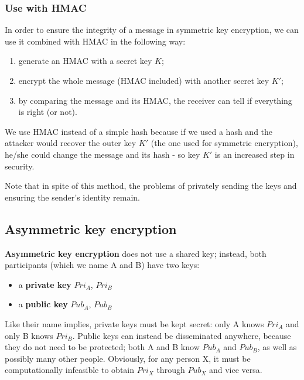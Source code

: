 
\subsubsection{Use with HMAC}
In order to ensure the integrity of a message in symmetric key encryption, we can use it combined with HMAC in the following way:

\begin{enumerate}
    \item generate an HMAC with a secret key $K$;
    \item encrypt the whole message (HMAC included) with another secret key $K'$;
    \item by comparing the message and its HMAC, the receiver can tell if everything is right (or not).
\end{enumerate}

We use HMAC instead of a simple hash because if we used a hash and the attacker would recover the outer key $K'$ (the one used for symmetric encryption), he/she could change the message and its hash - so key $K'$ is an increased step in security.

Note that in spite of this method, the problems of privately sending the keys and ensuring the sender's identity remain.


\subsection{Asymmetric key encryption}
\textbf{Asymmetric key encryption} does not use a shared key; instead, both participants (which we name A and B) have two keys:

\begin{itemize}
    \item a \textbf{private key} $Pri_A$, $Pri_B$
    \item a \textbf{public key} $Pub_A$, $Pub_B$
\end{itemize}

Like their name implies, private keys must be kept secret: only A knows $Pri_A$ and only B knows $Pri_B$. Public keys can instead be disseminated anywhere, because they do not need to be protected; both A and B know $Pub_A$ and $Pub_B$, as well as possibly many other people. Obviously, for any person X, it must be computationally infeasible to obtain $Pri_X$ through $Pub_X$ and vice versa.

